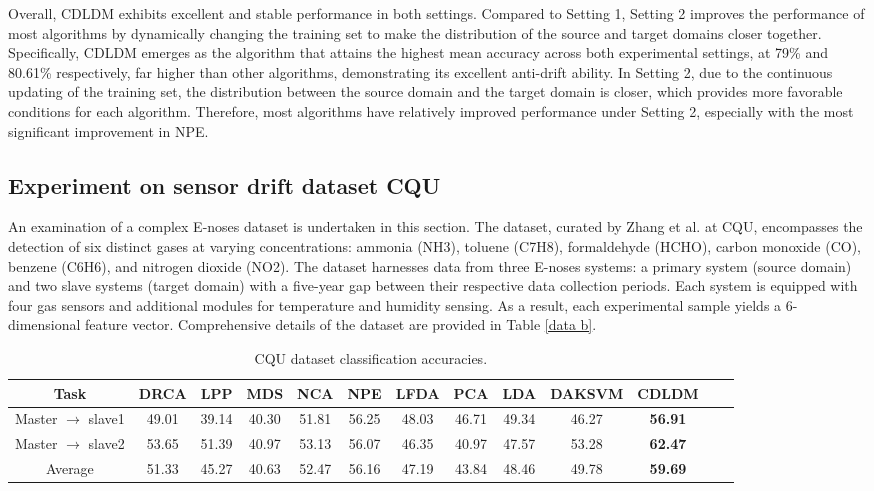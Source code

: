 \documentclass[a4paper]{cas-sc}
\begin{document}
Overall, CDLDM exhibits excellent and stable performance in both settings. Compared to Setting 1, Setting 2 improves the performance of most algorithms by dynamically changing the training set to make the distribution of the source and target domains closer together.
Specifically, CDLDM emerges as the algorithm that attains the highest mean accuracy across both experimental settings, at 79\% and 80.61\% respectively, far higher than other algorithms, demonstrating its excellent anti-drift ability. In Setting 2, due to the continuous updating of the training set, the distribution between the source domain and the target domain is closer, which provides more favorable conditions for each algorithm. Therefore, most algorithms have relatively improved performance under Setting 2, especially with the most significant improvement in NPE.


\subsection{Experiment on sensor drift dataset CQU}\label{EB}



An examination of a complex E-noses dataset is undertaken in this section. The dataset, curated by Zhang et al. \cite{6722922} at CQU, encompasses the detection of six distinct gases at varying concentrations: ammonia (NH3), toluene (C7H8), formaldehyde (HCHO), carbon monoxide (CO), benzene (C6H6), and nitrogen dioxide (NO2). The dataset harnesses data from three E-noses systems:
a primary system (source domain) and two slave systems (target domain) with a five-year gap between their respective data collection periods. Each system is equipped with four gas sensors and additional modules for temperature and humidity sensing. As a result, each experimental sample yields a 6-dimensional feature vector. Comprehensive details of the dataset are provided in Table \ref{data b}.

\begin{table}[ht]
\centering
\setlength{\abovecaptionskip}{0pt}
\caption{CQU dataset classification accuracies.}
\setlength{\tabcolsep}{2 mm}
\begin{tabular}{@{}ccccccccccccc@{}}
\toprule
Task & DRCA & LPP & MDS & NCA & NPE & LFDA & PCA & LDA & DAKSVM & CDLDM \\
\midrule
Master $\rightarrow$ slave1 & 49.01 & 39.14 & 40.30 & 51.81 & 56.25 & 48.03 & 46.71 & 49.34 & 46.27 & \bfseries{56.91} \\
Master $\rightarrow$ slave2 & 53.65 & 51.39 & 40.97 & 53.13 & 56.07 & 46.35 & 40.97 & 47.57 & 53.28 & \bfseries{62.47} \\
Average & 51.33 & 45.27 & 40.63 & 52.47 & 56.16 & 47.19 & 43.84 & 48.46 & 49.78 & \bfseries{59.69}\\

\bottomrule
\end{tabular}
\label{4.3.1}
\end{table}
\end{document}
